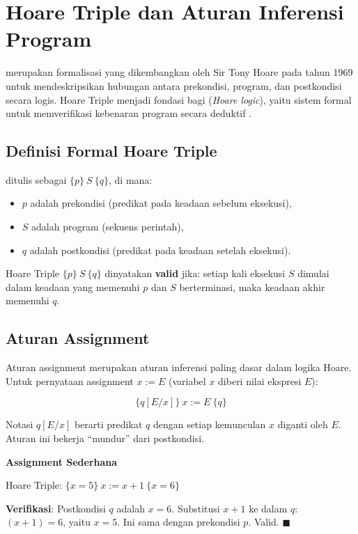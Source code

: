 \section{Hoare Triple dan Aturan Inferensi Program}

 merupakan formalisasi yang dikembangkan oleh Sir Tony Hoare pada tahun 1969 untuk mendeskripsikan hubungan antara prekondisi, program, dan postkondisi secara logis. Hoare Triple menjadi fondasi bagi  (\textit{Hoare logic}), yaitu sistem formal untuk memverifikasi kebenaran program secara deduktif \cite{hoare1969}.

\subsection{Definisi Formal Hoare Triple}

\begin{definisi}
 ditulis sebagai $\{p\}\ S\ \{q\}$, di mana:
\begin{itemize}
    \item $p$ adalah prekondisi (predikat pada keadaan sebelum eksekusi),
    \item $S$ adalah program (sekuens perintah),
    \item $q$ adalah postkondisi (predikat pada keadaan setelah eksekusi).
\end{itemize}
Hoare Triple $\{p\}\ S\ \{q\}$ dinyatakan \textbf{valid} jika: setiap kali eksekusi $S$ dimulai dalam keadaan yang memenuhi $p$ dan $S$ berterminasi, maka keadaan akhir memenuhi $q$.
\end{definisi}

\subsection{Aturan Assignment}

Aturan assignment merupakan aturan inferensi paling dasar dalam logika Hoare. Untuk pernyataan assignment $x := E$ (variabel $x$ diberi nilai ekspresi $E$):

\[ \{q[E/x]\}\ x := E\ \{q\} \]

Notasi $q[E/x]$ berarti predikat $q$ dengan setiap kemunculan $x$ diganti oleh $E$. Aturan ini bekerja ``mundur'' dari postkondisi.

\begin{contoh}
\textbf{Assignment Sederhana}

Hoare Triple: $\{x = 5\}\ x := x + 1\ \{x = 6\}$

\textbf{Verifikasi}: Postkondisi $q$ adalah $x = 6$. Substitusi $x + 1$ ke dalam $q$: $(x + 1) = 6$, yaitu $x = 5$. Ini sama dengan prekondisi $p$. Valid. $\blacksquare$
\end{contoh}

